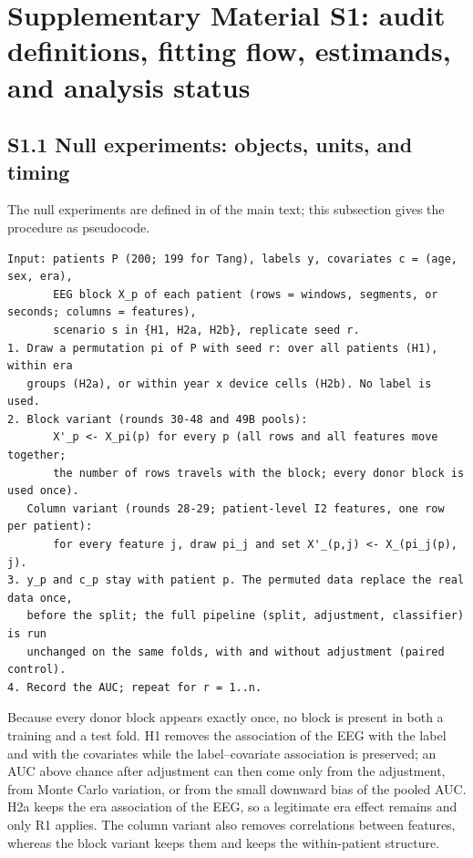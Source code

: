 \setcounter{table}{0}\setcounter{figure}{0}\setcounter{equation}{0}
\renewcommand{\thetable}{S1.\arabic{table}}
\renewcommand{\thefigure}{S1.\arabic{figure}}
\renewcommand{\theequation}{S1.\arabic{equation}}

\section*{Supplementary Material S1: audit definitions, fitting flow, estimands, and analysis status}\label{sec:s1}

\subsection*{S1.1 Null experiments: objects, units, and timing}
The null experiments are defined in  of the main text; this subsection gives the procedure as pseudocode.
{\footnotesize
\begin{verbatim}
Input: patients P (200; 199 for Tang), labels y, covariates c = (age, sex, era),
       EEG block X_p of each patient (rows = windows, segments, or seconds; columns = features),
       scenario s in {H1, H2a, H2b}, replicate seed r.
1. Draw a permutation pi of P with seed r: over all patients (H1), within era
   groups (H2a), or within year x device cells (H2b). No label is used.
2. Block variant (rounds 30-48 and 49B pools):
       X'_p <- X_pi(p) for every p (all rows and all features move together;
       the number of rows travels with the block; every donor block is used once).
   Column variant (rounds 28-29; patient-level I2 features, one row per patient):
       for every feature j, draw pi_j and set X'_(p,j) <- X_(pi_j(p), j).
3. y_p and c_p stay with patient p. The permuted data replace the real data once,
   before the split; the full pipeline (split, adjustment, classifier) is run
   unchanged on the same folds, with and without adjustment (paired control).
4. Record the AUC; repeat for r = 1..n.
\end{verbatim}
}
Because every donor block appears exactly once, no block is present in both a training and a test fold. H1 removes the association of the EEG with the label and with the covariates while the label--covariate association is preserved; an AUC above chance after adjustment can then come only from the adjustment, from Monte Carlo variation, or from the small downward bias of the pooled AUC. H2a keeps the era association of the EEG, so a legitimate era effect remains and only R1 applies. The column variant also removes correlations between features, whereas the block variant keeps them and keeps the within-patient structure.

